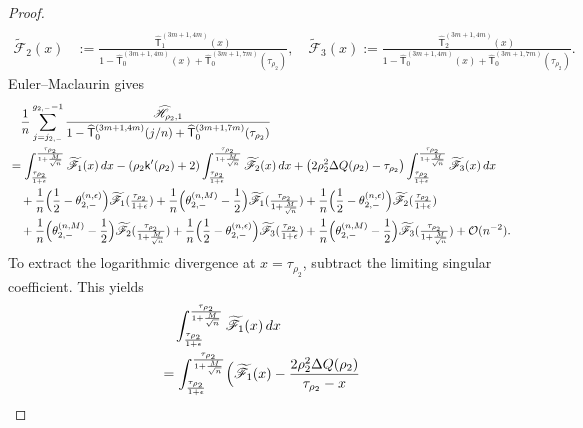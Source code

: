 \documentclass[a4paper]{article}
\numberwithin{equation}{section}
\begin{document}
\begin{proof}
\begin{align*}
\\
\widetilde{\mathscr{F}}_2(x)&:=
\frac{\widehat{\mathsf{T}}_{1}^{(3m+1,4m)}(x)}{1-\widehat{\mathsf{T}}_0^{(3m+1,4m)}(x)+\widehat{\mathsf{T}}_0^{(3m+1,7m)}(\tau_{\rho_2})},
\quad
\widetilde{\mathscr{F}}_3(x):=
\frac{\widehat{\mathsf{T}}_{2}^{(3m+1,4m)}(x)}{1-\widehat{\mathsf{T}}_0^{(3m+1,4m)}(x)+\widehat{\mathsf{T}}_0^{(3m+1,7m)}(\tau_{\rho_2})}.
\end{align*}
Euler--Maclaurin gives
\begin{align*}
&\quad \frac{1}{n}
\sum_{j=j_{2,-}}^{g_{2,-}-1}\frac{\widehat{\mathscr{H}}_{\rho_2,1}}{1-\widehat{\mathsf{T}}_0^{(3m+1,4m)}(j/n)+\widehat{\mathsf{T}}_0^{(3m+1,7m)}(\tau_{\rho_2})}
\\
&=\int_{\frac{\tau_{\rho_2}}{1+\epsilon}}^{\frac{\tau_{\rho_2}}{1+\frac{M}{\sqrt{n}}}}
\widetilde{\mathscr{F}}_1(x)\,dx
-(\rho_2\mathsf{k}'(\rho_2)+2)
\int_{\frac{\tau_{\rho_2}}{1+\epsilon}}^{\frac{\tau_{\rho_2}}{1+\frac{M}{\sqrt{n}}}}\widetilde{\mathscr{F}}_2(x)\,dx
+\bigl( 
2\rho_2^2\Delta Q(\rho_2)-\tau_{\rho_2}
\bigr)\int_{\frac{\tau_{\rho_2}}{1+\epsilon}}^{\frac{\tau_{\rho_2}}{1+\frac{M}{\sqrt{n}}}}\widetilde{\mathscr{F}}_3(x)\,dx
\\
&\quad 
+\frac{1}{n}\Bigl(\frac{1}{2}-\theta_{2,-}^{(n,\epsilon)}\Bigr)
\widetilde{\mathscr{F}}_1(\tfrac{\tau_{\rho_2}}{1+\epsilon})
+\frac{1}{n}\Bigl(\theta_{2,-}^{(n,M)}-\frac{1}{2}\Bigr)
\widetilde{\mathscr{F}}_1(\tfrac{\tau_{\rho_2}}{1+\frac{M}{\sqrt{n}}})
+\frac{1}{n}\Bigl(\frac{1}{2}-\theta_{2,-}^{(n,\epsilon)}\Bigr)
\widetilde{\mathscr{F}}_2(\tfrac{\tau_{\rho_2}}{1+\epsilon})
\\
&\quad 
+\frac{1}{n}\Bigl(\theta_{2,-}^{(n,M)}-\frac{1}{2}\Bigr)
\widetilde{\mathscr{F}}_2(\tfrac{\tau_{\rho_2}}{1+\frac{M}{\sqrt{n}}})
+\frac{1}{n}\Bigl(\frac{1}{2}-\theta_{2,-}^{(n,\epsilon)}\Bigr)
\widetilde{\mathscr{F}}_3(\tfrac{\tau_{\rho_2}}{1+\epsilon})
+\frac{1}{n}\Bigl(\theta_{2,-}^{(n,M)}-\frac{1}{2}\Bigr)
\widetilde{\mathscr{F}}_3(\tfrac{\tau_{\rho_2}}{1+\frac{M}{\sqrt{n}}})
+\mathcal{O}(n^{-2}). 
\end{align*}
To extract the logarithmic divergence at $x=\tau_{\rho_2}$, subtract the
limiting singular coefficient.  This yields
\begin{align*}
&\quad \int_{\frac{\tau_{\rho_2}}{1+\epsilon}}^{\frac{\tau_{\rho_2}}{1+\frac{M}{\sqrt{n}}}}
\widetilde{\mathscr{F}}_1(x)\,dx
\\
&=
\int_{\frac{\tau_{\rho_2}}{1+\epsilon}}^{\frac{\tau_{\rho_2}}{1+\frac{M}{\sqrt{n}}}}
\Bigl(\widetilde{\mathscr{F}}_1(x)
-\frac{2\rho_2^2\Delta Q(\rho_2)}{\tau_{\rho_2}-x}

\end{align*}
\end{proof}
\end{document}
